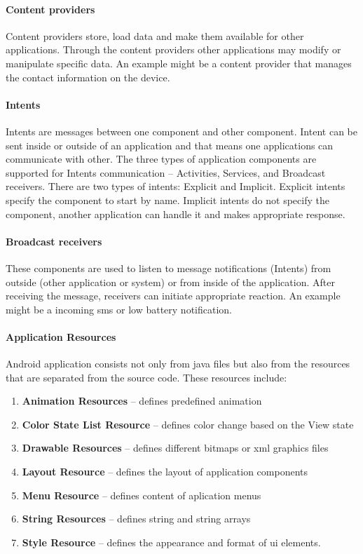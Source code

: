 \paragraph{Content providers}
Content providers store, load data and make them available for other applications. Through the content providers other applications may modify or manipulate specific data. An example might be a content provider that manages the contact information on the device.

\paragraph{Intents}
Intents are messages between one component and other component. Intent can be sent inside or outside of an application and that means one applications can communicate with other. The three types of application components are supported for Intents communication -- Activities, Services, and Broadcast receivers. There are two types of intents: Explicit and Implicit. Explicit intents specify the component to start by name. Implicit intents do not specify the component, another application can handle it and makes appropriate response.

\paragraph{Broadcast receivers}
These components are used to listen to message notifications (Intents) from outside (other application or system) or from inside of the application. After receiving the message, receivers can initiate appropriate reaction. An example might be a incoming sms or low battery notification.

\paragraph{Application Resources}
Android application consists not only from java files but also from the resources that are separated from the source code. These resources include:
\begin{enumerate}
\item \textbf{Animation Resources} -- defines predefined animation
\item \textbf{Color State List Resource} -- defines color change based on the View state
\item \textbf{Drawable Resources} -- defines different bitmaps or xml graphics files
\item \textbf{Layout Resource} -- defines the layout of application components
\item \textbf{Menu Resource} -- defines content of aplication menus
\item \textbf{String Resources} -- defines string and string arrays
\item \textbf{Style Resource} -- defines the appearance and format of ui elements.
\end{enumerate}

